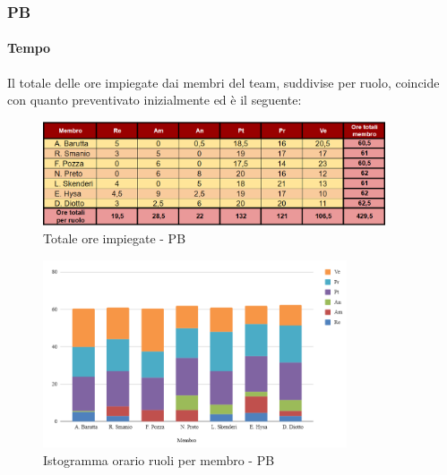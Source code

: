 \vspace{0.3cm}

\subsubsection{PB}

\paragraph{Tempo}
Il totale delle ore impiegate  dai membri del team, suddivise per ruolo, coincide con quanto preventivato inizialmente ed è il seguente:

\begin{figure}[H]
    \centering
    \includegraphics[width=0.9\textwidth]{../Images/riepilogoPBOreMembro.png}
    \caption{Totale ore impiegate - PB}
    \label{fig:Tot_orePB}
\end{figure}

\vspace{0.6cm}

\begin{figure}[H]
    \centering
    \includegraphics[width=0.8\textwidth]{../Images/graficoOrarioRuoloPB.png}
    \caption{Istogramma orario ruoli per membro - PB}
    \label{fig:GraficoOrePB}
\end{figure}

